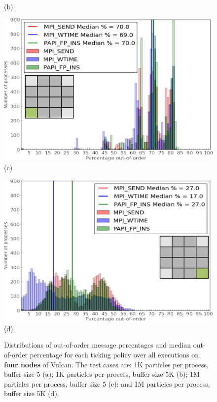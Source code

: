 \begin{figure}[!htb]
\begin{minipage}[b]{0.5\linewidth}
        \\ (b) \\
    \end{minipage}
    \begin{minipage}[b]{0.5\linewidth}
        \centering
        \includegraphics[width=0.95\linewidth]{chapter_3_figures/hist_nodes4_procs64_particles1000000_cycles10_bufferSize5.pdf}
        \\ (c) \\
    \end{minipage}
    \begin{minipage}[b]{0.5\linewidth}
        \centering
        \includegraphics[width=0.95\linewidth]{chapter_3_figures/hist_nodes4_procs64_particles1000000_cycles10_bufferSize5000.pdf}
       \\ (d) \\
    \end{minipage}
    \caption{Distributions of out-of-order message percentages and
      median out-of-order percentage for each ticking policy over all
      executions on \textbf{four nodes} of Vulcan.
      The test cases are: 
      1K particles per process, buffer size 5 (a); 
      1K particles per process, buffer size 5K (b);
      1M particles per process, buffer size 5 (c);
      and 1M particles per process, buffer size 5K (d).}
    \label{fig:resutls4}  
\end{figure}

